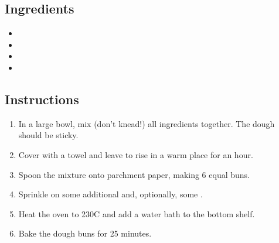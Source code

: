 \documentclass[12pt]{article}
\begin{document}
\recipetitle

\subsection*{Ingredients}

\begin{itemize}[nolistsep]
    \item {}
    \item {}
    \item {}
    \item {}
\end{itemize}

\subsection*{Instructions}

\begin{enumerate}
    \item In a large bowl, mix (don't knead!) all ingredients together. The dough should be sticky.
    \item Cover with a towel and leave to rise in a warm place for an hour.
    \item Spoon the mixture onto parchment paper, making 6 equal buns.
    \item Sprinkle on some additional  and, optionally, some .
    \item Heat the oven to 230{\degrees}C and add a water bath to the bottom shelf.
    \item Bake the dough buns for 25 minutes.
\end{enumerate}
\end{document}
